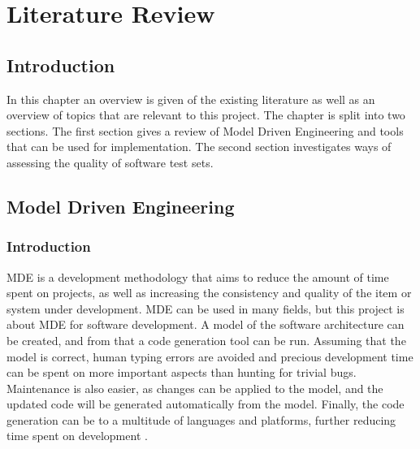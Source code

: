 \chapter{Literature Review}
\label{chap:LitReview}

\section{Introduction}
In this chapter an overview is given of the existing literature as well as an overview of topics that are relevant to this project. The chapter is split into two sections. The first section gives a review of Model Driven Engineering and tools that can be used for implementation. The second section investigates ways of assessing the quality of software test sets.

\section{Model Driven Engineering}

\subsection{Introduction}
\ac{MDE} is a development methodology that aims to reduce the amount of time spent on projects, as well as increasing the consistency and quality of the item or system under development. \ac{MDE} can be used in many fields, but this project is about \ac{MDE} for software development. A model of the software architecture can be created, and from that a code generation tool can be run. Assuming that the model is correct, human typing errors are avoided and precious development time can be spent on more important aspects than hunting for trivial bugs. Maintenance is also easier, as changes can be applied to the model, and the updated code will be generated automatically from the model. Finally, the code generation can be to a multitude of languages and platforms, further reducing time spent on development \cite{mdseLano}.


